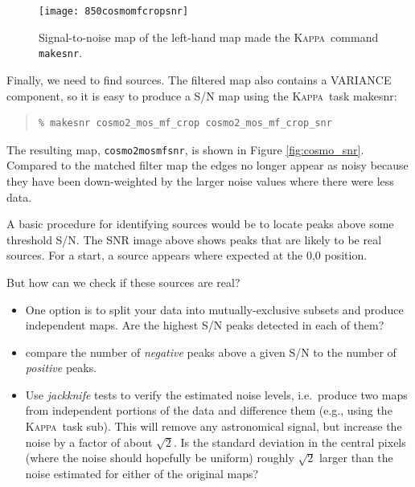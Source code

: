 \documentclass[twoside,11pt]{article}
\newcommand{\xref}[3]{#1}
\renewcommand{\_}{\texttt{\symbol{95}}}
\newenvironment{myquote}{\begin{quote}\begin{small}}{\end{small}\end{quote}}
\newcommand{\Kappa}{\xref{\textsc{Kappa}}{sun95}{}}
\newcommand{\task}[1]{\textsf{#1}}
\newcommand{\makesnr}{\xref{\task{makesnr}}{sun95}{MAKESNR}}
\newcommand{\sub}{\xref{\task{sub}}{sun95}{SUB}}
\begin{document}
\begin{figure}
\begin{center}
\texttt{[image: 850cosmo\_mf\_crop\_snr]}
\caption{\small Signal-to-noise map of the left-hand map made the \Kappa\ command \texttt{makesnr}.}
\label{fig:cosmo_crop}
\end{center}
\end{figure}

Finally, we need to find sources. The filtered map also contains a VARIANCE component, so it is easy to produce a S/N map using the \Kappa\ task \makesnr:

\begin{myquote}
\begin{verbatim}
% makesnr cosmo2_mos_mf_crop cosmo2_mos_mf_crop_snr
\end{verbatim}
\end{myquote}

The resulting map, \texttt{cosmo2\_mos\_mf\_snr}, is shown in Figure \ref{fig:cosmo_snr}. Compared to the matched filter map the edges no longer appear as noisy because they have been down-weighted
by the larger noise values where there were less data.

A basic procedure for identifying sources would be to locate peaks above some threshold S/N.  The SNR image above shows peaks that are likely to be real sources. For a start, a source appears where expected at the 0,0 position. 

But how can we check if these sources are real? 
\begin{itemize}

\item One option is to split your data into mutually-exclusive subsets and produce
  independent maps. Are the highest S/N peaks detected in each of
  them?
\item compare the number of {\em negative} peaks above a given S/N to the number of {\em positive} peaks.
\item Use {\em jackknife} tests to verify the estimated noise levels,
  i.e.~produce two maps from independent portions of the data and
  difference them (e.g., using the \Kappa\ task \sub). This will
  remove any astronomical signal, but increase the noise by a factor
  of about $\sqrt{2}$. Is the standard deviation in the central pixels
  (where the noise should hopefully be uniform) roughly $\sqrt{2}$
  larger than the noise estimated for either of the original maps?
\end{itemize}

\end{document}
